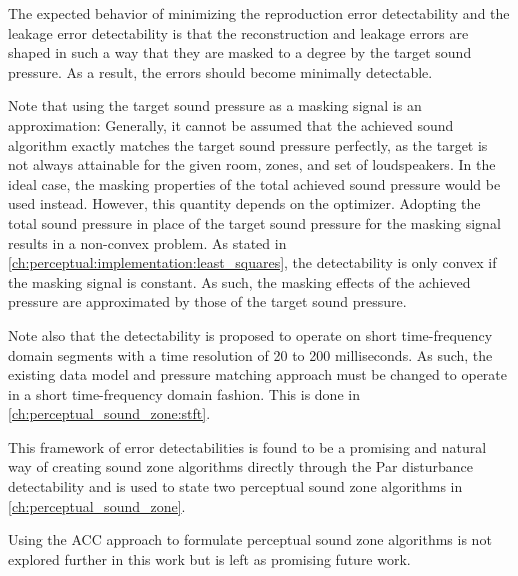 The expected behavior of minimizing the reproduction error detectability and the leakage error detectability is that the reconstruction and leakage errors are shaped in such a way that they are masked to a degree by the 
target sound pressure.
As a result, the errors should become minimally detectable.

Note that using the target sound pressure as a masking signal is an approximation: 
Generally, it cannot be assumed that the achieved sound algorithm exactly matches the target sound pressure perfectly, as the target is not always attainable for the given room, zones, and set of loudspeakers.
In the ideal case, the masking properties of the total achieved sound pressure would be used instead.
However, this quantity depends on the optimizer.
Adopting the total sound pressure in place of the target sound pressure for the masking signal results in a non-convex 
problem.
As stated in \autoref{ch:perceptual:implementation:least_squares}, the detectability is only convex if the masking signal 
is constant.
As such, the masking effects of the achieved pressure are approximated by those of the target sound pressure.

Note also that the detectability is proposed to operate on short time-frequency domain segments 
with a time resolution of 20 to 200 milliseconds. 
As such, the existing data model and pressure matching approach must be changed to operate in a short time-frequency 
domain fashion.
This is done in \autoref{ch:perceptual_sound_zone:stft}.

This framework of error detectabilities is found to be a promising and natural way of creating sound zone algorithms directly through the Par disturbance detectability and is used to state two perceptual sound zone algorithms in \autoref{ch:perceptual_sound_zone}.

Using the ACC approach to formulate perceptual sound zone algorithms is not explored further in this work but is left as promising future work.
